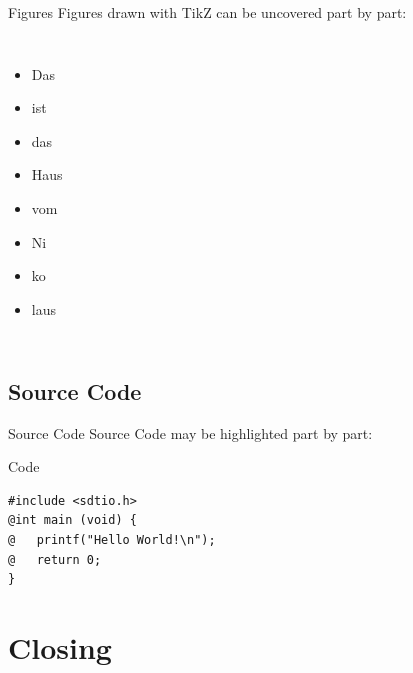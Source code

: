\documentclass[fleqn,compress,utf8,aspectratio=169,t]{beamer}
\begin{document}
\begin{frame}{Figures}
  Figures drawn with TikZ can be uncovered part by part:
  \begin{columns}[t]
    \begin{itemize}
      \item<2-> Das
      \item<3-> ist
      \item<4-> das
      \item<5-> Haus
      \item<6-> vom
      \item<7-> Ni
      \item<8-> ko
      \item<9-> laus
    \end{itemize}
    \begin{figure}
    \end{figure}
  \end{columns}
\end{frame}

\subsection{Source Code}

\begin{frame}[fragile]{Source Code}
  Source Code may be highlighted part by part:
  \begin{block}{Code}
    \begin{lstlisting}[style=basec]
#include <sdtio.h>
@int main (void) {
@   printf("Hello World!\n");
@   return 0;
}
\end{lstlisting}
  \end{block}
\end{frame}


\section{Closing}
\end{document}
